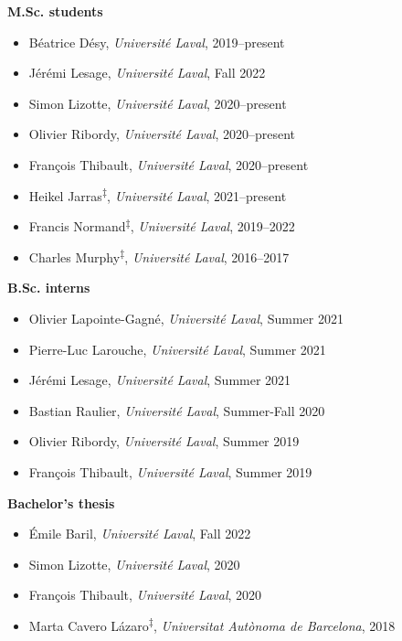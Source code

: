 \documentclass[11pt]{article}
\begin{document}
%
%
%
\textbf{M.Sc. students}
%
\begin{itemize}
  \item B\'eatrice D\'esy, \textit{Universit\'e Laval}, 2019--present
  \item Jérémi Lesage, \textit{Universit\'e Laval}, Fall 2022
  \item Simon Lizotte, \textit{Universit\'e Laval}, 2020--present
  \item Olivier Ribordy, \textit{Universit\'e Laval}, 2020--present
  \item Fran\c{c}ois Thibault, \textit{Universit\'e Laval}, 2020--present
  \item Heikel Jarras\textsuperscript{$\ddagger$}, \textit{Universit\'e Laval}, 2021--present
  \item Francis Normand\textsuperscript{$\ddagger$}, \textit{Universit\'e Laval}, 2019--2022 \href{http://hdl.handle.net/20.500.11794/73573}{}
  \item Charles Murphy\textsuperscript{$\ddagger$}, \textit{Universit\'e Laval}, 2016--2017 \href{http://hdl.handle.net/20.500.11794/30382}{}
\end{itemize}
%
%
%
\textbf{B.Sc. interns}
%
\begin{itemize}
  \item Olivier Lapointe-Gagn\'e, \textit{Universit\'e Laval}, Summer 2021
  \item Pierre-Luc Larouche, \textit{Universit\'e Laval}, Summer 2021
  \item Jérémi Lesage, \textit{Universit\'e Laval}, Summer 2021
  \item Bastian Raulier, \textit{Universit\'e Laval}, Summer-Fall 2020
  \item Olivier Ribordy, \textit{Universit\'e Laval}, Summer 2019
  \item Fran\c{c}ois Thibault, \textit{Universit\'e Laval}, Summer 2019
\end{itemize}
%
%
%
\textbf{Bachelor's thesis}
%
\begin{itemize}
  \item Émile Baril, \textit{Universit\'e Laval}, Fall 2022
  \item Simon Lizotte, \textit{Universit\'e Laval}, 2020
  \item Fran\c{c}ois Thibault, \textit{Universit\'e Laval}, 2020
  \item Marta Cavero L\'azaro\textsuperscript{$\ddagger$}, \textit{Universitat Aut\`onoma de Barcelona}, 2018
\end{itemize} \vspace{0.75\baselineskip}
\end{document}
